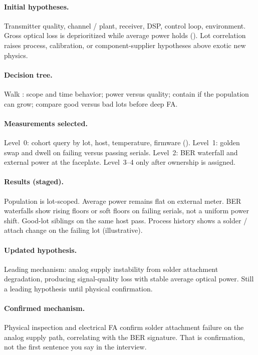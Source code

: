 \paragraph{Initial hypotheses.}
Transmitter quality, channel / plant, receiver, DSP, control loop, environment.
Gross optical loss is deprioritized while average power holds
(). Lot correlation raises process, calibration, or
component-supplier hypotheses above exotic new physics.

\paragraph{Decision tree.}
Walk : scope and time
behavior; power versus quality; contain if the population can grow; compare
good versus bad lots before deep FA.

\paragraph{Measurements selected.}
Level~0: cohort query by lot, host, temperature, firmware
(). Level~1: golden swap and dwell on failing versus
passing serials. Level~2: BER waterfall and external power at the faceplate.
Level~3--4 only after ownership is assigned.

\paragraph{Results (staged).}
Population is lot-scoped. Average power remains flat on external meter. BER
waterfalls show rising floors or soft floors on failing serials, not a uniform
power shift. Good-lot siblings on the same host pass. Process history shows a
solder / attach change on the failing lot (illustrative).

\paragraph{Updated hypothesis.}
Leading mechanism: analog supply instability from solder attachment degradation,
producing signal-quality loss with stable average optical power. Still a leading
hypothesis until physical confirmation.

\paragraph{Confirmed mechanism.}
Physical inspection and electrical FA confirm solder attachment failure on the
analog supply path, correlating with the BER signature. That is confirmation,
not the first sentence you say in the interview.


